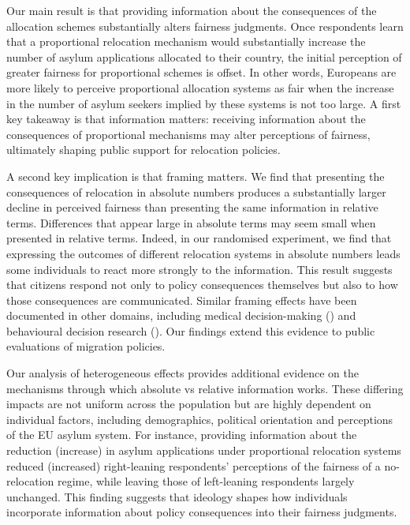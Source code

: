 \documentclass[
  12pt,
  a4paper,
]{article}
\begin{document}
Our main result is that providing information about the consequences of the allocation schemes substantially alters fairness judgments. Once respondents learn that a proportional relocation mechanism would substantially increase the number of asylum applications allocated to their country, the initial perception of greater fairness for proportional schemes is offset. In other words, Europeans are more likely to perceive proportional allocation systems as fair when the increase in the number of asylum seekers implied by these systems is not too large. A first key takeaway is that information matters: receiving information about the consequences of proportional mechanisms may alter perceptions of fairness, ultimately shaping public support for relocation policies.

A second key implication is that framing matters. We find that presenting the consequences of relocation in absolute numbers produces a substantially larger decline in perceived fairness than presenting the same information in relative terms. Differences that appear large in absolute terms may seem small when presented in relative terms. Indeed, in our randomised experiment, we find that expressing the outcomes of different relocation systems in absolute numbers leads some individuals to react more strongly to the information. This result suggests that citizens respond not only to policy consequences themselves but also to how those consequences are communicated. Similar framing effects have been documented in other domains, including medical decision-making () and behavioural decision research (). Our findings extend this evidence to public evaluations of migration policies.

Our analysis of heterogeneous effects provides additional evidence on the mechanisms through which absolute vs relative information works. These differing impacts are not uniform across the population but are highly dependent on individual factors, including demographics, political orientation and perceptions of the EU asylum system. For instance, providing information about the reduction (increase) in asylum applications under proportional relocation systems reduced (increased) right-leaning respondents' perceptions of the fairness of a no-relocation regime, while leaving those of left-leaning respondents largely unchanged. This finding suggests that ideology shapes how individuals incorporate information about policy consequences into their fairness judgments.
\end{document}
